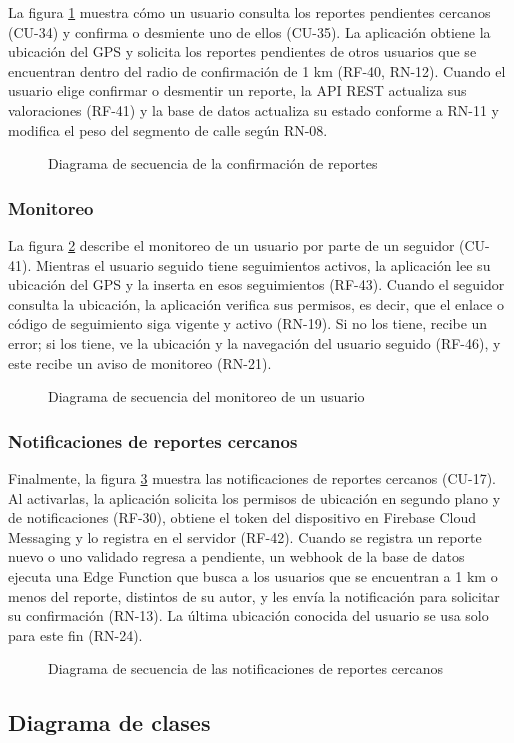 La figura \ref{fig:sd_confirmacion} muestra cómo un usuario consulta los reportes pendientes cercanos (CU-34) y confirma o desmiente uno de ellos (CU-35). La aplicación obtiene la ubicación del GPS y solicita los reportes pendientes de otros usuarios que se encuentran dentro del radio de confirmación de 1 km (RF-40, RN-12). Cuando el usuario elige confirmar o desmentir un reporte, la API REST actualiza sus valoraciones (RF-41) y la base de datos actualiza su estado conforme a RN-11 y modifica el peso del segmento de calle según RN-08.

\begin{figure}[htbp]
    \centering
    
    \caption{Diagrama de secuencia de la confirmación de reportes}
    \label{fig:sd_confirmacion}
\end{figure}

\subsubsection{Monitoreo}

La figura \ref{fig:sd_monitoreo} describe el monitoreo de un usuario por parte de un seguidor (CU-41). Mientras el usuario seguido tiene seguimientos activos, la aplicación lee su ubicación del GPS y la inserta en esos seguimientos (RF-43). Cuando el seguidor consulta la ubicación, la aplicación verifica sus permisos, es decir, que el enlace o código de seguimiento siga vigente y activo (RN-19). Si no los tiene, recibe un error; si los tiene, ve la ubicación y la navegación del usuario seguido (RF-46), y este recibe un aviso de monitoreo (RN-21).

\begin{figure}[htbp]
    \centering
    
    \caption{Diagrama de secuencia del monitoreo de un usuario}
    \label{fig:sd_monitoreo}
\end{figure}

\subsubsection{Notificaciones de reportes cercanos}

Finalmente, la figura \ref{fig:sd_alertas} muestra las notificaciones de reportes cercanos (CU-17). Al activarlas, la aplicación solicita los permisos de ubicación en segundo plano y de notificaciones (RF-30), obtiene el token del dispositivo en Firebase Cloud Messaging y lo registra en el servidor (RF-42). Cuando se registra un reporte nuevo o uno validado regresa a pendiente, un webhook de la base de datos ejecuta una Edge Function que busca a los usuarios que se encuentran a 1 km o menos del reporte, distintos de su autor, y les envía la notificación para solicitar su confirmación (RN-13). La última ubicación conocida del usuario se usa solo para este fin (RN-24).

\begin{figure}[htbp]
    \centering
    
    \caption{Diagrama de secuencia de las notificaciones de reportes cercanos}
    \label{fig:sd_alertas}
\end{figure}

\subsection{Diagrama de clases}
